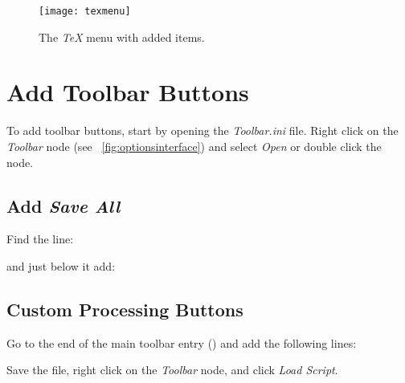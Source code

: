\begin{figure}
	\centering
	\texttt{[image: texmenu]}
	\caption{The \textit{TeX} menu with added items.}
	\label{fig:texmenu}
\end{figure}

\section{Add Toolbar Buttons}
To add toolbar buttons, start by opening the \emph{Toolbar.ini} file.  Right click on the \emph{Toolbar} node (see \figurename~\ref{fig:optionsinterface}) and select \emph{Open} or double click the node.

\subsection{Add \textit{Save All}}
Find the line:
\begin{plainlist}
	\item {}
\end{plainlist}

and just below it add:
\begin{plainlist}
	\item {}
\end{plainlist}

\subsection{Custom Processing Buttons}

Go to the end of the main toolbar entry () and add the following lines:
\begin{plainlist}
	\item {}
	\item {}
	\item {}
	\item {}
	\item {}
\end{plainlist}
Save the file, right click on the \emph{Toolbar} node, and click \emph{Load Script}.

